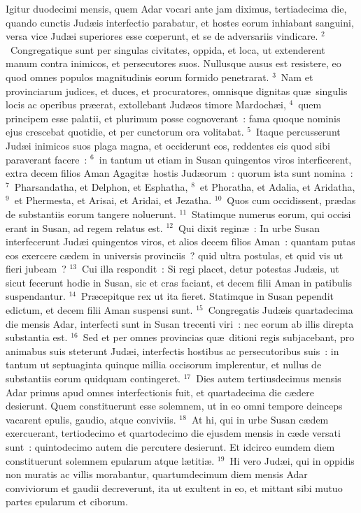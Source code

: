 \lettrine[lines=3,image=true,loversize=0.05,lraise=-0.03]{I}{}gitur duodecimi mensis, quem Adar vocari ante jam diximus, tertiadecima die, quando cunctis Jud\ae is interfectio parabatur, et hostes eorum inhiabant sanguini, versa vice Jud\ae i superiores esse cœperunt, et se de adversariis vindicare.
${}^{2}$~Congregatique sunt per singulas civitates, oppida, et loca, ut extenderent manum contra inimicos, et persecutores suos. Nullusque ausus est resistere, eo quod omnes populos magnitudinis eorum formido penetrarat.
${}^{3}$~Nam et provinciarum judices, et duces, et procuratores, omnisque dignitas qu\ae\ singulis locis ac operibus pr\ae erat, extollebant Jud\ae os timore Mardoch\ae i,
${}^{4}$~quem principem esse palatii, et plurimum posse cognoverant~: fama quoque nominis ejus crescebat quotidie, et per cunctorum ora volitabat.
${}^{5}$~Itaque percusserunt Jud\ae i inimicos suos plaga magna, et occiderunt eos, reddentes eis quod sibi paraverant facere~:
${}^{6}$~in tantum ut etiam in Susan quingentos viros interficerent, extra decem filios Aman Agagit\ae\ hostis Jud\ae orum~: quorum ista sunt nomina~:
${}^{7}$~Pharsandatha, et Delphon, et Esphatha,
${}^{8}$~et Phoratha, et Adalia, et Aridatha,
${}^{9}$~et Phermesta, et Arisai, et Aridai, et Jezatha.
${}^{10}$~Quos cum occidissent, pr\ae das de substantiis eorum tangere noluerunt.
${}^{11}$~Statimque numerus eorum, qui occisi erant in Susan, ad regem relatus est.
${}^{12}$~Qui dixit regin\ae~: In urbe Susan interfecerunt Jud\ae i quingentos viros, et alios decem filios Aman~: quantam putas eos exercere c\ae dem in universis provinciis~? quid ultra postulas, et quid vis ut fieri jubeam~?
${}^{13}$~Cui illa respondit~: Si regi placet, detur potestas Jud\ae is, ut sicut fecerunt hodie in Susan, sic et cras faciant, et decem filii Aman in patibulis suspendantur.
${}^{14}$~Pr\ae cepitque rex ut ita fieret. Statimque in Susan pependit edictum, et decem filii Aman suspensi sunt.
${}^{15}$~Congregatis Jud\ae is quartadecima die mensis Adar, interfecti sunt in Susan trecenti viri~: nec eorum ab illis direpta substantia est.
${}^{16}$~Sed et per omnes provincias qu\ae\ ditioni regis subjacebant, pro animabus suis steterunt Jud\ae i, interfectis hostibus ac persecutoribus suis~: in tantum ut septuaginta quinque millia occisorum implerentur, et nullus de substantiis eorum quidquam contingeret.
${}^{17}$~Dies autem tertiusdecimus mensis Adar primus apud omnes interfectionis fuit, et quartadecima die c\ae dere desierunt. Quem constituerunt esse solemnem, ut in eo omni tempore deinceps vacarent epulis, gaudio, atque conviviis.
${}^{18}$~At hi, qui in urbe Susan c\ae dem exercuerant, tertiodecimo et quartodecimo die ejusdem mensis in c\ae de versati sunt~: quintodecimo autem die percutere desierunt. Et idcirco eumdem diem constituerunt solemnem epularum atque l\ae titi\ae .
${}^{19}$~Hi vero Jud\ae i, qui in oppidis non muratis ac villis morabantur, quartumdecimum diem mensis Adar conviviorum et gaudii decreverunt, ita ut exultent in eo, et mittant sibi mutuo partes epularum et ciborum.


